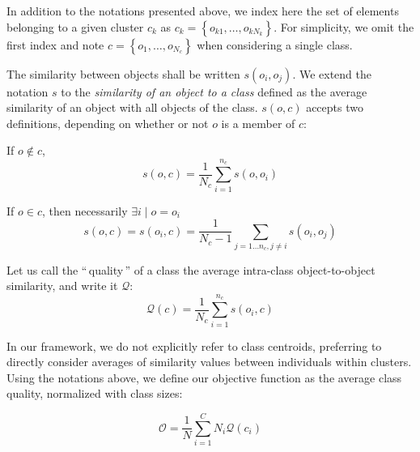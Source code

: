 \documentclass[natbib,smallextended]{svjour3}
\newcommand{\gl}[1]{``\,#1\,''} %
\begin{document}
In addition to the notations presented above, we index here the set of elements belonging to a given cluster $c_k$ as $c_k = \left\{o_{k1}, \ldots, o_{kN_k}\right\}$.
For simplicity, we omit the first index and note $c = \left\{o_1, \ldots, o_{N_c}\right\}$ when considering a single class.

The similarity between objects shall be written $s\left(o_i, o_j\right)$.
We extend the notation $s$ to the \emph{similarity of an object to a
  class} defined as the average similarity of an object
with all objects of the class. $s(o,c)$ accepts two definitions,
depending on whether or not $o$ is a member of $c$:

If $o \notin c$,
\begin{equation}
  s\left(o,c\right) = \frac{1}{N_c} \sum_{i=1}^{n_c}s\left(o, o_i\right)
   \label{eq:soc_notinclass}
\end{equation}

If $o \in c$, then necessarily $\exists i \mid o = o_i$
\begin{equation}
  s\left(o,c\right) = s\left(o_i, c\right) = \frac{1}{N_c-1} \sum_{j=1 \ldots n_c, j \neq i} s\left(o_i, o_j\right)
  	 \label{eq:soc_inclass}
\end{equation}

Let us call the \gl{quality} of a class the average intra-class object-to-object similarity, and write it $\mathcal{Q}$:
\begin{equation}
	\mathcal{Q}\left(c\right) = \frac{1}{N_c} \sum_{i=1}^{n_c} s\left(o_i, c\right)
    \label{eq:class_qual_base}
\end{equation}


In our framework, we do not explicitly refer to class centroids, preferring to directly consider averages of similarity values between individuals within clusters. Using the notations above, we define our objective function as the average class quality, normalized with class sizes:

\begin{equation}
  \mathcal{O} = \frac{1}{N} \sum_{i=1}^{C} N_i \mathcal{Q}(c_i)
  \label{eq:objective_function}
\end{equation}
\end{document}
